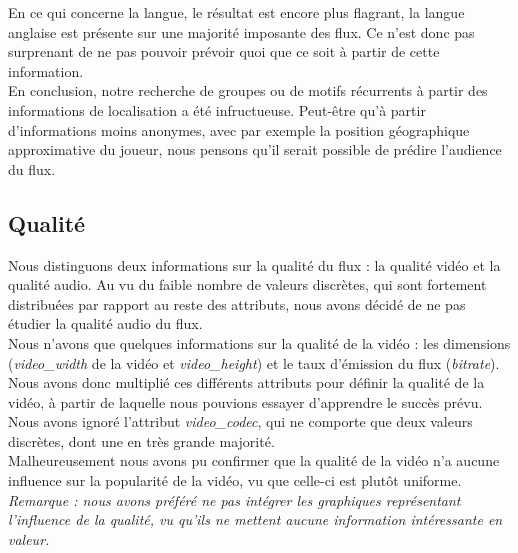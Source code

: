 \documentclass[11pt, a4paper, titlepage]{scrartcl}
\begin{document}
En ce qui concerne la langue, le résultat est encore plus flagrant, la langue
anglaise est présente sur une majorité imposante des flux. Ce n'est donc pas
surprenant de ne pas pouvoir prévoir quoi que ce soit à partir de cette
information. \\

En conclusion, notre recherche de groupes ou de motifs récurrents à partir des
informations de localisation a été infructueuse. Peut-être qu'à partir
d'informations moins anonymes, avec par exemple la position géographique
approximative du joueur, nous pensons qu'il serait possible de prédire
l'audience du flux.

\subsection{Qualité}

Nous distinguons deux informations sur la qualité du flux : la qualité vidéo et
la qualité audio. Au vu du faible nombre de valeurs discrètes, qui sont
fortement distribuées par rapport au reste des attributs, nous avons décidé de
ne pas étudier la qualité audio du flux. \\

Nous n'avons que quelques informations sur la qualité de la vidéo : les
dimensions (\textit{video\_width} de la vidéo et \textit{video\_height}) et le
taux d'émission du flux (\textit{bitrate}). Nous avons donc multiplié ces
différents attributs pour définir la qualité de la vidéo, à partir de laquelle
nous pouvions essayer d'apprendre le succès prévu. Nous avons ignoré l'attribut
\textit{video\_codec}, qui ne comporte que deux valeurs discrètes, dont une en
très grande majorité. \\

Malheureusement nous avons pu confirmer que la qualité de la vidéo n'a aucune
influence sur la popularité de la vidéo, vu que celle-ci est plutôt uniforme.
\\

\textit{Remarque : nous avons préféré ne pas intégrer les graphiques
    représentant l'influence de la qualité, vu qu'ils ne mettent aucune
    information intéressante en valeur.} \\
\end{document}
